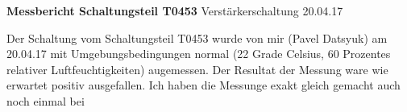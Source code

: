 \textbf{Messbericht Schaltungsteil T0453} Verstärkerschaltung 20.04.17

Der Schaltung vom Schaltungsteil T0453 wurde von mir (Pavel Datsyuk) am 20.04.17 mit Umgebungsbedingungen normal (22 Grade Celsius, 60 Prozentes relativer Luftfeuchtigkeiten) augemessen. Der Resultat der Messung ware wie erwartet positiv ausgefallen. Ich haben die Messunge exakt gleich gemacht auch noch einmal bei 